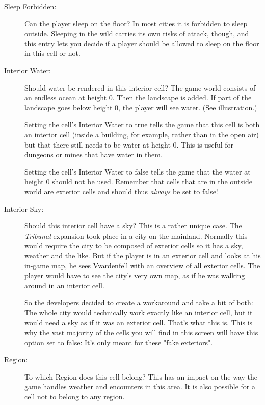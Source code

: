 \begin{description}
 \item[Sleep Forbidden:] Can the player sleep on the floor? In most cities it is forbidden to sleep outside. Sleeping in the wild carries its own risks of attack, though, and this entry lets you decide if a player should be allowed to sleep on the floor in this cell or not.
 
 \item[Interior Water:] Should water be rendered in this interior cell? The game world consists of an endless ocean at height 0. Then the landscape is added. If part of the landscape goes below height 0, the player will see water. (See illustration.)
 
 Setting the cell's Interior Water to true tells the game that this cell is both an interior cell (inside a building, for example, rather than in the open air) but that there still needs to be water at height 0. This is useful for dungeons or mines that have water in them.
 
 Setting the cell's Interior Water to false tells the game that the water at height 0 should not be used. Remember that cells that are in the outside world are exterior cells and should thus \textit{always} be set to false!
 
 \item[Interior Sky:] Should this interior cell have a sky? This is a rather unique case. The \textit{Tribunal} expansion took place in a city on the mainland. Normally this would require the city to be composed of exterior cells so it has a sky, weather and the like. But if the player is in an exterior cell and looks at his in-game map, he sees Vvardenfell with an overview of all exterior cells. The player would have to see the city's very own map, as if he was walking around in an interior cell.
 
 So the developers decided to create a workaround and take a bit of both: The whole city would technically work exactly like an interior cell, but it would need a sky as if it was an exterior cell. That's what this is. This is why the vast majority of the cells you will find in this screen will have this option set to false: It's only meant for these "fake exteriors".
 
 \item[Region:] To which Region does this cell belong? This has an impact on the way the game handles weather and encounters in this area. It is also possible for a cell not to belong to any region.
 
\end{description}

